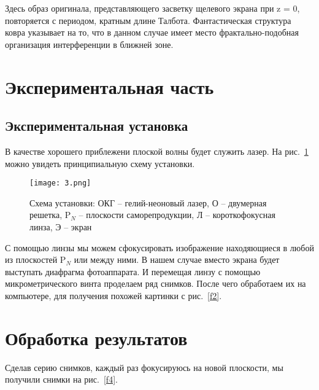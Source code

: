 \documentclass{urticle}
\begin{document}
    Здесь образ оригинала, представляющего засветку щелевого экрана при z = 0, повторяется с периодом, кратным длине Талбота. Фантастическая структура ковра указывает на то, что в данном случае имеет место фрактально-подобная организация интерференции в ближней зоне.
    
\newpage    
\section{Экспериментальная часть}
\subsection{Экспериментальная установка}

    В качестве хорошего приблежени плоской волны будет служить лазер. На рис.~\ref{f3} можно увидеть принципиальную схему установки. 
    \begin{figure}[h]
        \begin{center}
            \texttt{[image: 3.png]}
        \end{center}
        \caption{Схема установки: ОКГ -- гелий-неоновый лазер, О -- двумерная решетка, P$_N$ -- плоскости саморепродукции, Л -- короткофокусная линза, Э -- экран}
        \label{f3}
    \end{figure}
    
    С помощью линзы мы можем сфокусировать изображение находяющиеся в любой из плоскостей P$_N$ или между ними. В нашем случае вместо экрана будет выступать диафрагма фотоаппарата. И перемещая линзу с помощью микрометрического винта проделаем ряд снимков. После чего обработаем их на компьютере, для получения похожей картинки с рис.~\ref{f2}.
    
\section{Обработка результатов}

    Сделав серию снимков, каждый раз фокусируюсь на новой плоскости, мы получили снимки на рис.~\ref{f4}.
\end{document}
